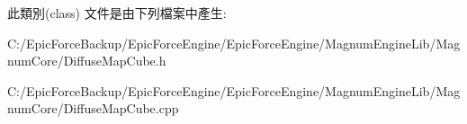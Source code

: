 此類別(class) 文件是由下列檔案中產生\+:\begin{DoxyCompactItemize}
\item 
C\+:/\+Epic\+Force\+Backup/\+Epic\+Force\+Engine/\+Epic\+Force\+Engine/\+Magnum\+Engine\+Lib/\+Magnum\+Core/Diffuse\+Map\+Cube.\+h\item 
C\+:/\+Epic\+Force\+Backup/\+Epic\+Force\+Engine/\+Epic\+Force\+Engine/\+Magnum\+Engine\+Lib/\+Magnum\+Core/Diffuse\+Map\+Cube.\+cpp\end{DoxyCompactItemize}
